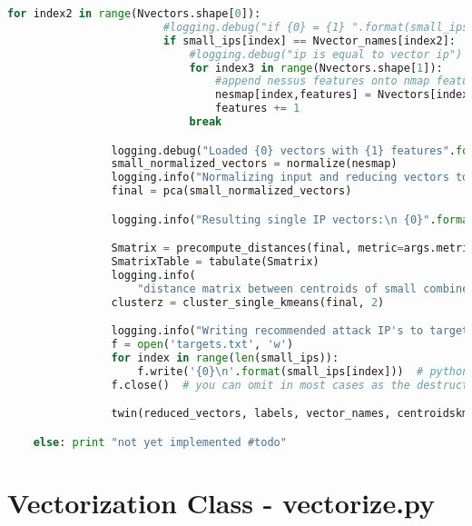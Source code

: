 \begin{lstlisting}[language=python]
                    for index2 in range(Nvectors.shape[0]):
                        #logging.debug("if {0} = {1} ".format(small_ips[index], Nvector_names[index2]))
                        if small_ips[index] == Nvector_names[index2]:
                            #logging.debug("ip is equal to vector ip")
                            for index3 in range(Nvectors.shape[1]):
                                #append nessus features onto nmap features
                                nesmap[index,features] = Nvectors[index2, index3]
                                features += 1
                            break

                logging.debug("Loaded {0} vectors with {1} features".format(nesmap.shape[0], nesmap.shape[1]))
                small_normalized_vectors = normalize(nesmap)
                logging.info("Normalizing input and reducing vectors to two dimensions with PCA")
                final = pca(small_normalized_vectors)

                logging.info("Resulting single IP vectors:\n {0}".format(final))

                Smatrix = precompute_distances(final, metric=args.metric)
                SmatrixTable = tabulate(Smatrix)
                logging.info(
                    "distance matrix between centroids of small combined clusters: {0} :\n{1}".format(args.metric, SmatrixTable))
                clusterz = cluster_single_kmeans(final, 2)

                logging.info("Writing recommended attack IP's to targets.txt for exploitation\n {0}")
                f = open('targets.txt', 'w')
                for index in range(len(small_ips)):
                    f.write('{0}\n'.format(small_ips[index]))  # python will convert \n to os.linesep
                f.close()  # you can omit in most cases as the destructor will call it

                twin(reduced_vectors, labels, vector_names, centroidskmeans, n_clusters, cluster_details, Nreduced_vectors, Nlabels, Nvector_names, Ncentroidskmeans, Nn_clusters, Ncluster_details, small_ips, final, clusterz, twinpath)

    else: print "not yet implemented #todo"
\end{lstlisting}


\section{Vectorization Class - vectorize.py}
\label{vectorize.py}
